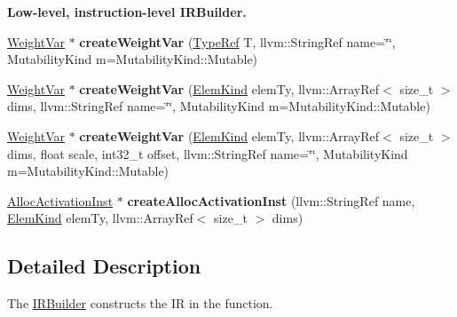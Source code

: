 \begin{Indent}\textbf{ Low-\/level, instruction-\/level I\+R\+Builder.}\par
\begin{DoxyCompactItemize}
\item 
\mbox{\label{classglow_1_1_i_r_builder_a69e5f48ff30dc959cff577db07091dc4}} 
\hyperlink{classglow_1_1_weight_var}{Weight\+Var} $\ast$ {\bfseries create\+Weight\+Var} (\hyperlink{structglow_1_1_type}{Type\+Ref} T, llvm\+::\+String\+Ref name=\char`\"{}\char`\"{}, Mutability\+Kind m=Mutability\+Kind\+::\+Mutable)
\item 
\mbox{\label{classglow_1_1_i_r_builder_a253be63420f6267ef74aa36726dc659a}} 
\hyperlink{classglow_1_1_weight_var}{Weight\+Var} $\ast$ {\bfseries create\+Weight\+Var} (\hyperlink{namespaceglow_ab92e14a94329daf4083db670e95fbcdf}{Elem\+Kind} elem\+Ty, llvm\+::\+Array\+Ref$<$ size\+\_\+t $>$ dims, llvm\+::\+String\+Ref name=\char`\"{}\char`\"{}, Mutability\+Kind m=Mutability\+Kind\+::\+Mutable)
\item 
\mbox{\label{classglow_1_1_i_r_builder_a2d0d2cf0068685693c804870258d560a}} 
\hyperlink{classglow_1_1_weight_var}{Weight\+Var} $\ast$ {\bfseries create\+Weight\+Var} (\hyperlink{namespaceglow_ab92e14a94329daf4083db670e95fbcdf}{Elem\+Kind} elem\+Ty, llvm\+::\+Array\+Ref$<$ size\+\_\+t $>$ dims, float scale, int32\+\_\+t offset, llvm\+::\+String\+Ref name=\char`\"{}\char`\"{}, Mutability\+Kind m=Mutability\+Kind\+::\+Mutable)
\item 
\mbox{\label{classglow_1_1_i_r_builder_a1db80a32bbe4e6b19e7a5d0cd72277cf}} 
\hyperlink{classglow_1_1_alloc_activation_inst}{Alloc\+Activation\+Inst} $\ast$ {\bfseries create\+Alloc\+Activation\+Inst} (llvm\+::\+String\+Ref name, \hyperlink{namespaceglow_ab92e14a94329daf4083db670e95fbcdf}{Elem\+Kind} elem\+Ty, llvm\+::\+Array\+Ref$<$ size\+\_\+t $>$ dims)
\end{DoxyCompactItemize}
\end{Indent}


\subsection{Detailed Description}
The \hyperlink{classglow_1_1_i_r_builder}{I\+R\+Builder} constructs the IR in the function. 

